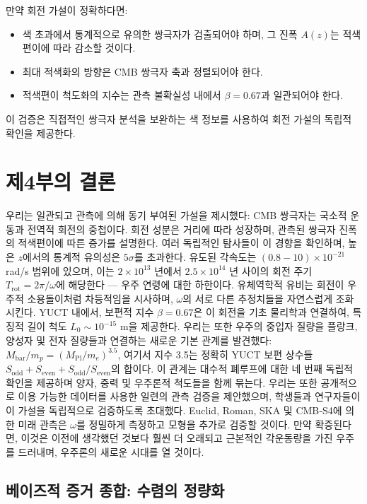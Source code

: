 \documentclass[11pt,a4paper]{article}
\begin{document}
	만약 회전 가설이 정확하다면:
	\begin{itemize}
		\item 색 초과에서 통계적으로 유의한 쌍극자가 검출되어야 하며, 그 진폭 \(A(z)\)는 적색편이에 따라 감소할 것이다.
		\item 최대 적색화의 방향은 CMB 쌍극자 축과 정렬되어야 한다.
		\item 적색편이 척도화의 지수는 관측 불확실성 내에서 \(\beta = 0.67\)과 일관되어야 한다.
	\end{itemize}
	
	이 검증은 직접적인 쌍극자 분석을 보완하는 색 정보를 사용하여 회전 가설의 독립적 확인을 제공한다.
	
	\section{제4부의 결론}
	
	우리는 일관되고 관측에 의해 동기 부여된 가설을 제시했다: CMB 쌍극자는 국소적 운동과 전역적 회전의 중첩이다. 회전 성분은 거리에 따라 성장하며, 관측된 쌍극자 진폭의 적색편이에 따른 증가를 설명한다. 여러 독립적인 탐사들이 이 경향을 확인하며, 높은 \(z\)에서의 통계적 유의성은 \(5\sigma\)를 초과한다. 유도된 각속도는 \((0.8-10)\times10^{-21}\) rad/s 범위에 있으며, 이는 \(2\times10^{13}\) 년에서 \(2.5\times10^{14}\) 년 사이의 회전 주기 \(T_{\text{rot}} = 2\pi/\omega\)에 해당한다 — 우주 연령에 대한 하한이다. 유체역학적 유비는 회전이 우주적 소용돌이처럼 차등적임을 시사하며, \(\omega\)의 서로 다른 추정치들을 자연스럽게 조화시킨다. YUCT 내에서, 보편적 지수 \(\beta = 0.67\)은 이 회전을 기초 물리학과 연결하여, 특징적 길이 척도 \(L_0 \sim 10^{-15}\) m을 제공한다. 우리는 또한 우주의 중입자 질량을 플랑크, 양성자 및 전자 질량들과 연결하는 새로운 기본 관계를 발견했다: \(M_{\mathrm{bar}}/m_p = (M_{\mathrm{Pl}}/m_e)^{3.5}\), 여기서 지수 3.5는 정확히 YUCT 보편 상수들 \(S_{\mathrm{odd}} + S_{\mathrm{even}} + S_{\mathrm{odd}}/S_{\mathrm{even}}\)의 합이다. 이 관계는 대수적 폐루프에 대한 네 번째 독립적 확인을 제공하며 양자, 중력 및 우주론적 척도들을 함께 묶는다. 우리는 또한 공개적으로 이용 가능한 데이터를 사용한 일련의 관측 검증을 제안했으며, 학생들과 연구자들이 이 가설을 독립적으로 검증하도록 초대했다. Euclid, Roman, SKA 및 CMB‑S4에 의한 미래 관측은 \(\omega\)를 정밀하게 측정하고 모형을 추가로 검증할 것이다. 만약 확증된다면, 이것은 이전에 생각했던 것보다 훨씬 더 오래되고 근본적인 각운동량을 가진 우주를 드러내며, 우주론의 새로운 시대를 열 것이다.
	
	\subsection{베이즈적 증거 종합: 수렴의 정량화}
	
\end{document}
